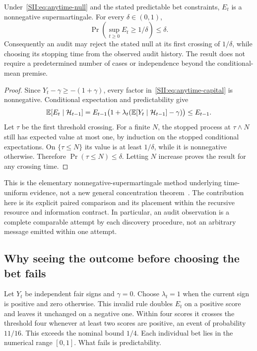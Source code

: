 \begin{SIItheorem}\label{SII:thm:anytime}
Under~\eqref{SII:eq:anytime-null} and the stated predictable bet constraints, $E_t$ is a nonnegative supermartingale. For every $\delta\in(0,1)$,
\[
\Pr\left(\sup_{t\geq0}E_t\geq1/\delta\right)\leq\delta.
\]
Consequently an audit may reject the stated null at its first crossing of $1/\delta$, while choosing its stopping time from the observed audit history. The result does not require a predetermined number of cases or independence beyond the conditional-mean premise.
\end{SIItheorem}
\begin{proof}
Since $Y_t-\gamma\geq-(1+\gamma)$, every factor in~\eqref{SII:eq:anytime-capital} is nonnegative. Conditional expectation and predictability give
\[
\mathbb E[E_t\mid\mathcal H_{t-1}]
=E_{t-1}\bigl(1+\lambda_t(\mathbb E[Y_t\mid\mathcal H_{t-1}]-\gamma)\bigr)
\leq E_{t-1}.
\]
Let $\tau$ be the first threshold crossing. For a finite $N$, the stopped process at $\tau\wedge N$ still has expected value at most one, by induction on the stopped conditional expectations. On $\{\tau\leq N\}$ its value is at least $1/\delta$, while it is nonnegative otherwise. Therefore $\Pr(\tau\leq N)\leq\delta$. Letting $N$ increase proves the result for any crossing time.
\end{proof}

This is the elementary nonnegative-supermartingale method underlying time-uniform evidence, not a new general concentration theorem~\cite{SII:howard}. The contribution here is its explicit paired comparison and its placement within the recursive resource and information contract. In particular, an audit observation is a complete comparable attempt by each discovery procedure, not an arbitrary message emitted within one attempt.

\subsection{Why seeing the outcome before choosing the bet fails}
\begin{SIIcounterexample}\label{SII:ex:hindsight-bet}
Let $Y_t$ be independent fair signs and $\gamma=0$. Choose $\lambda_t=1$ when the current sign is positive and zero otherwise. This invalid rule doubles $E_t$ on a positive score and leaves it unchanged on a negative one. Within four scores it crosses the threshold four whenever at least two scores are positive, an event of probability $11/16$. This exceeds the nominal bound $1/4$. Each individual bet lies in the numerical range $[0,1]$. What fails is predictability.
\end{SIIcounterexample}

